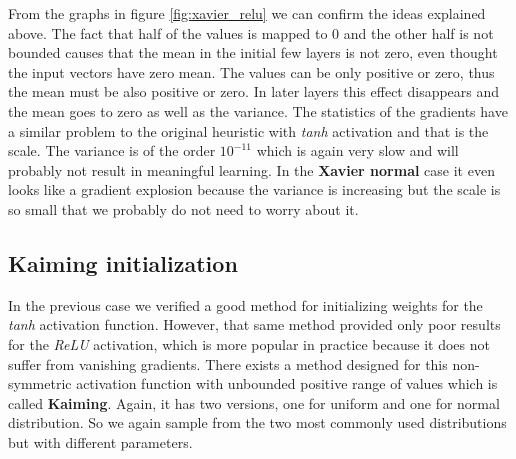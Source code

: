 \documentclass[a4paper,11pt]{article}
\begin{document}
From the graphs in figure \ref{fig:xavier_relu} we can confirm the ideas explained above.
The fact that half of the values is mapped to 0 and the other half is not bounded causes that the mean in the initial few layers is not zero, even thought the input vectors have zero mean.
The values can be only positive or zero, thus the mean must be also positive or zero.
In later layers this effect disappears and the mean goes to zero as well as the variance.
The statistics of the gradients have a similar problem to the original heuristic with \textit{tanh} activation and that is the scale.
The variance is of the order $10^{-11}$ which is again very slow and will probably not result in meaningful learning.
In the \textbf{Xavier normal} case it even looks like a gradient explosion because the variance is increasing but the scale is so small that we probably do not need to worry about it.

\subsection{Kaiming initialization}
In the previous case we verified a good method for initializing weights for the \textit{tanh} activation function.
However, that same method provided only poor results for the \textit{ReLU} activation, which is more popular in practice because it does not suffer from vanishing gradients.
There exists a method designed for this non-symmetric activation function with unbounded positive range of values which is called \textbf{Kaiming}.
Again, it has two versions, one for uniform and one for normal distribution.
So we again sample from the two most commonly used distributions but with different parameters.
\end{document}
